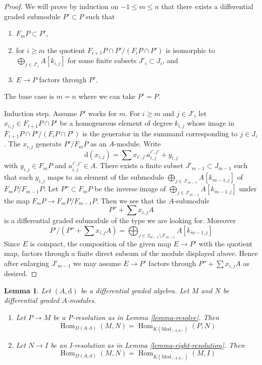 \documentclass{stacks-project}
\theoremstyle{plain}
\newtheorem{lemma}[subsection]{Lemma}
\theoremstyle{definition}
\theoremstyle{remark}
\numberwithin{equation}{subsection}
\def\Hom{\mathop{\mathrm{Hom}}\nolimits}
\begin{document}
\begin{proof}
We will prove by induction on $-1 \leq m \leq n$ that there exists
a differential graded submodule $P' \subset P$  such that
\begin{enumerate}
\item $F_mP \subset P'$,
\item for $i \geq m$ the quotient $F_{i + 1}P \cap P'/(F_iP \cap P')$ is
isomorphic to $\bigoplus_{j \in J'_i} A[k_{i, j}]$ for some finite subsets
$J'_i \subset J_i$, and
\item $E \to P$ factors through $P'$.
\end{enumerate}
The base case is $m = n$ where we can take $P' = P$.

\medskip\noindent
Induction step. Assume $P'$ works for $m$.
For $i \geq m$ and $j \in J'_i$ let $x_{i, j} \in F_{i + 1}P \cap P'$
be a homogeneous element of degree $k_{i, j}$ whose image in
$F_{i + 1}P \cap P'/(F_iP \cap P')$ is the generator in
the summand corresponding to $j \in J_i$. The
$x_{i, j}$ generate $P'/F_mP$ as an $A$-module. Write
$$
\text{d}(x_{i, j}) = \sum x_{i', j'} a_{i, j}^{i', j'} + y_{i, j}
$$
with $y_{i, j} \in F_mP$ and $a_{i, j}^{i', j'} \in A$.
There exists a finite subset
$J'_{m - 1} \subset J_{m - 1}$ such that each $y_{i, j}$ maps to
an element of the submodule $\bigoplus_{j \in J'_{m - 1}} A[k_{m - 1, j}]$
of $F_mP/F_{m - 1}P$. Let $P'' \subset F_mP$ be the inverse
image of $\bigoplus_{j \in J'_{m - 1}} A[k_{m - 1, j}]$ under
the map $F_mP \to F_mP/F_{m - 1}P$. Then we see that the $A$-submodule
$$
P'' + \sum x_{i, j}A
$$
is a differential graded submodule of the type we are looking for. Moreover
$$
P'/(P'' + \sum x_{i, j}A) =
\bigoplus\nolimits_{j \in J_{m - 1} \setminus J'_{m - 1}} A[k_{m - 1, j}]
$$
Since $E$ is compact, the composition of the given map $E \to P'$
with the quotient map, factors through a finite direct subsum of
the module displayed above. Hence after enlarging $J'_{m - 1}$
we may assume $E \to P'$ factors through
$P'' + \sum x_{i, j}A$ as desired.
\end{proof}

\begin{lemma}
\label{lemma-hom-derived}
Let $(A, \text{d})$ be a differential graded algebra.
Let $M$ and $N$ be differential graded $A$-modules.
\begin{enumerate}
\item Let $P \to M$ be a P-resolution as in
Lemma \ref{lemma-resolve}. Then
$$
\Hom_{D(A, \text{d})}(M, N) =
\Hom_{K(\text{Mod}_{(A, \text{d})})}(P, N)
$$
\item Let $N \to I$ be an I-resolution as in
Lemma \ref{lemma-right-resolution}. Then
$$
\Hom_{D(A, \text{d})}(M, N) =
\Hom_{K(\text{Mod}_{(A, \text{d})})}(M, I)
$$
\end{enumerate}
\end{lemma}
\end{document}
